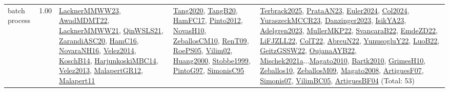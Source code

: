 {\begin{longtable}{p{3cm}r>{\raggedright\arraybackslash}p{6cm}>{\raggedright\arraybackslash}p{6cm}>{\raggedright\arraybackslash}p{8cm}}
\index{batch process}\index{Concepts!batch process}batch process &  1.00 & \hyperref[detail:LacknerMMWW23]{LacknerMMWW23}, \hyperref[detail:AwadMDMT22]{AwadMDMT22}, \hyperref[detail:LacknerMMWW21]{LacknerMMWW21}, \hyperref[detail:QinWSLS21]{QinWSLS21}, \hyperref[detail:ZarandiASC20]{ZarandiASC20}, \hyperref[detail:HamC16]{HamC16}, \hyperref[detail:NovaraNH16]{NovaraNH16}, \hyperref[detail:Velez2014]{Velez2014}, \hyperref[detail:KoschB14]{KoschB14}, \hyperref[detail:HarjunkoskiMBC14]{HarjunkoskiMBC14}, \hyperref[detail:Velez2013]{Velez2013}, \hyperref[detail:MalapertGR12]{MalapertGR12}, \hyperref[detail:Malapert11]{Malapert11} & \hyperref[detail:Tang2020]{Tang2020}, \hyperref[detail:TangB20]{TangB20}, \hyperref[detail:HamFC17]{HamFC17}, \hyperref[detail:Pinto2012]{Pinto2012}, \hyperref[detail:NovasH10]{NovasH10}, \hyperref[detail:ZeballosCM10]{ZeballosCM10}, \hyperref[detail:RenT09]{RenT09}, \hyperref[detail:RoePS05]{RoePS05}, \hyperref[detail:Vilim02]{Vilim02}, \hyperref[detail:Huang2000]{Huang2000}, \hyperref[detail:Stobbe1999]{Stobbe1999}, \hyperref[detail:PintoG97]{PintoG97}, \hyperref[detail:SimonisC95]{SimonisC95} & \hyperref[detail:Terbrack2025]{Terbrack2025}, \hyperref[detail:PrataAN23]{PrataAN23}, \hyperref[detail:Euler2024]{Euler2024}, \hyperref[detail:Col2024]{Col2024}, \hyperref[detail:YuraszeckMCCR23]{YuraszeckMCCR23}, \hyperref[detail:Danzinger2023]{Danzinger2023}, \hyperref[detail:IsikYA23]{IsikYA23}, \hyperref[detail:Adelgren2023]{Adelgren2023}, \hyperref[detail:MullerMKP22]{MullerMKP22}, \hyperref[detail:SvancaraB22]{SvancaraB22}, \hyperref[detail:EmdeZD22]{EmdeZD22}, \hyperref[detail:LiFJZLL22]{LiFJZLL22}, \hyperref[detail:ColT22]{ColT22}, \hyperref[detail:AbreuN22]{AbreuN22}, \hyperref[detail:YunusogluY22]{YunusogluY22}, \hyperref[detail:LuoB22]{LuoB22}, \hyperref[detail:GeitzGSSW22]{GeitzGSSW22}, \hyperref[detail:OujanaAYB22]{OujanaAYB22}, \hyperref[detail:Mischek2021a]{Mischek2021a}...\hyperref[detail:Magato2010]{Magato2010}, \hyperref[detail:Bartk2010]{Bartk2010}, \hyperref[detail:GrimesH10]{GrimesH10}, \hyperref[detail:Zeballos10]{Zeballos10}, \hyperref[detail:ZeballosM09]{ZeballosM09}, \hyperref[detail:Magato2008]{Magato2008}, \hyperref[detail:ArtiguesF07]{ArtiguesF07}, \hyperref[detail:Simonis07]{Simonis07}, \hyperref[detail:VilimBC05]{VilimBC05}, \hyperref[detail:ArtiguesBF04]{ArtiguesBF04} (Total: 53)\\

\end{longtable}}
